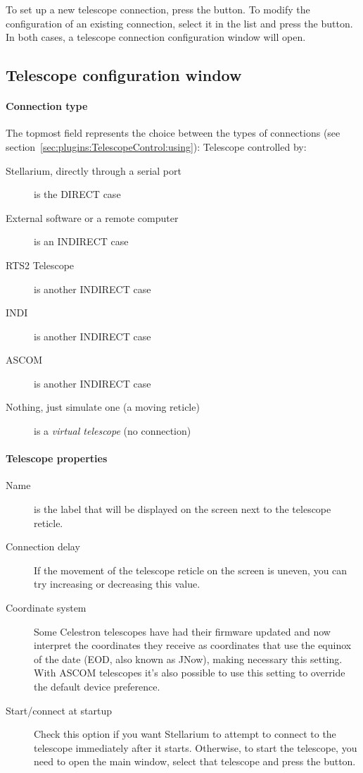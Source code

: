 \noindent To set up a new telescope connection, press the  button. To modify
the configuration of an existing connection, select it in the list and
press the  button. In both cases, a telescope connection
configuration window will open.



\subsection{Telescope configuration window}

\paragraph{Connection type}
The topmost field represents the choice between the types of connections (see section~\ref{sec:plugins:TelescopeControl:using}):
Telescope controlled by:
\begin{description}
\item[Stellarium, directly through a serial port] is the DIRECT case
\item[External software or a remote computer] is an INDIRECT case
\item[RTS2 Telescope] is another INDIRECT case
\item[INDI] is another INDIRECT case
\item[ASCOM] is another INDIRECT case
\item[Nothing, just simulate one (a moving reticle)] is a \emph{virtual telescope} (no connection)
\end{description}

\paragraph{Telescope properties}
\label{sec:plugins:TelescopeProperties}

\begin{description}
\item[Name] is the label that will be displayed on the screen next to
  the telescope reticle.
\item[Connection delay] If the movement of the telescope reticle on
  the screen is uneven, you can try increasing or decreasing this
  value.
\item[Coordinate system] Some Celestron telescopes have had their
  firmware updated and now interpret the coordinates they receive as
  coordinates that use the equinox of the date (EOD, also known as
  JNow), making necessary this setting. With ASCOM telescopes it's also
  possible to use this setting to override the default device preference. 
\item[Start/connect at startup] Check this option if you want
  Stellarium to attempt to connect to the telescope immediately after
  it starts. Otherwise, to start the telescope, you need to open the
  main window, select that telescope and press the 
  button.
\end{description}

